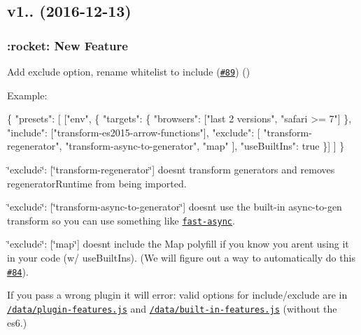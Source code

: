 \subsection*{v1.. (2016-\/12-\/13)}

\subsubsection*{\+:rocket\+: New Feature}


\begin{DoxyItemize}
\item Add {\ttfamily exclude} option, rename {\ttfamily whitelist} to {\ttfamily include} (\href{https://github.com/babel/babel-preset-env/pull/89}{\tt \#89}) ()
\end{DoxyItemize}

Example\+:


\begin{DoxyCode}
\{
  "presets": [
    ["env", \{
      "targets": \{
        "browsers": ["last 2 versions", "safari >= 7"]
      \},
      "include": ["transform-es2015-arrow-functions"],
      "exclude": [
        "transform-regenerator",
        "transform-async-to-generator",
        "map"
      ],
      "useBuiltIns": true
    \}]
  ]
\}
\end{DoxyCode}


{\ttfamily \char`\"{}exclude\char`\"{}\+: \mbox{[}\char`\"{}transform-\/regenerator\char`\"{}\mbox{]}} doesn\textquotesingle{}t transform generators and removes {\ttfamily regenerator\+Runtime} from being imported.

{\ttfamily \char`\"{}exclude\char`\"{}\+: \mbox{[}\char`\"{}transform-\/async-\/to-\/generator\char`\"{}\mbox{]}} doesn\textquotesingle{}t use the built-\/in async-\/to-\/gen transform so you can use something like \href{https://github.com/MatAtBread/fast-async}{\tt fast-\/async}.

{\ttfamily \char`\"{}exclude\char`\"{}\+: \mbox{[}\char`\"{}map\char`\"{}\mbox{]}} doesn\textquotesingle{}t include the {\ttfamily Map} polyfill if you know you aren\textquotesingle{}t using it in your code (w/ {\ttfamily use\+Built\+Ins}). (We will figure out a way to automatically do this \href{https://github.com/babel/babel-preset-env/issues/84}{\tt \#84}).

If you pass a wrong plugin it will error\+: valid options for {\ttfamily include/exclude} are in \href{https://github.com/babel/babel-preset-env/blob/master/data/plugin-features.js}{\tt /data/plugin-\/features.js} and \href{https://github.com/babel/babel-preset-env/blob/master/data/built-in-features.js}{\tt /data/built-\/in-\/features.js} (without the {\ttfamily es6.})

